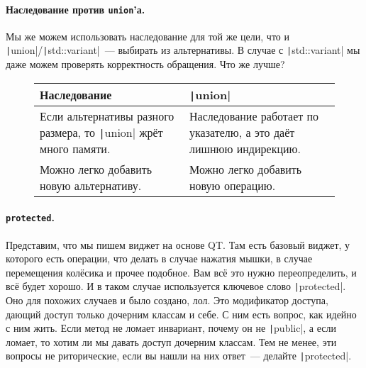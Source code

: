 \documentclass{article}
\begin{document}
    \paragraph{Наследование против \texttt{union}'а.}
    Мы же можем использовать наследование для той же цели, что и \texttt|union|/\texttt|std::variant|~--- выбирать из альтернативы. В случае с \texttt|std::variant| мы даже можем проверять корректность обращения. Что же лучше?
    \begin{figure}[H]
        \begin{tabular}{|m{}|m{}|}
            \hline
            Наследование & \texttt|union|\\
            \hline
            Если альтернативы разного размера, то \texttt|union| жрёт много памяти. & Наследование работает по указателю, а это даёт лишнюю индирекцию.\\
            \hline
            Можно легко добавить новую альтернативу. & Можно легко добавить новую операцию.\\
            \hline
        \end{tabular}
    \end{figure}
    \paragraph{\texttt{protected}.}
    Представим, что мы пишем виджет на основе QT. Там есть базовый виджет, у которого есть операции, что делать в случае нажатия мышки, в случае перемещения колёсика и прочее подобное. Вам всё это нужно переопределить, и всё будет хорошо. И в таком случае используется ключевое слово \texttt|protected|. Оно для похожих случаев и было создано, лол. Это модификатор доступа, дающий доступ только дочерним классам и себе. С ним есть вопрос, как идейно с ним жить. Если метод не ломает инвариант, почему он не \texttt|public|, а если ломает, то хотим ли мы давать доступ дочерним классам. Тем не менее, эти вопросы не риторические, если вы нашли на них ответ~--- делайте \texttt|protected|.
\end{document}
